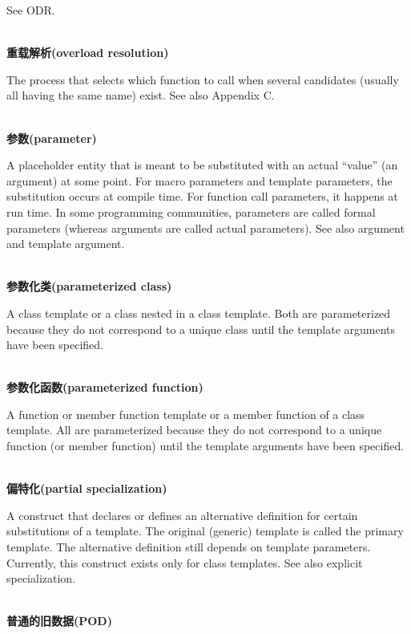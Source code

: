See ODR.

\hspace*{\fill} \\ %
\noindent
\textbf{重载解析(overload resolution)}

The process that selects which function to call when several candidates (usually all having the same name) exist. See also Appendix C.

\hspace*{\fill} \\ %
\noindent
\textbf{参数(parameter)}

A placeholder entity that is meant to be substituted with an actual “value” (an argument) at some point. For macro parameters and template parameters, the substitution occurs at compile time. For function call parameters, it happens at run time. In some programming communities, parameters are called formal parameters (whereas arguments are called actual parameters). See also argument and template argument.

\hspace*{\fill} \\ %
\noindent
\textbf{参数化类(parameterized class)}

A class template or a class nested in a class template. Both are parameterized because they do not correspond to a unique class until the template arguments have been specified.

\hspace*{\fill} \\ %
\noindent
\textbf{参数化函数(parameterized function)}

A function or member function template or a member function of a class template. All are parameterized because they do not correspond to a unique function (or member function) until the template arguments have been specified.

\hspace*{\fill} \\ %
\noindent
\textbf{偏特化(partial specialization)}

A construct that declares or defines an alternative definition for certain substitutions of a template. The original (generic) template is called the primary template. The alternative definition still depends on template parameters. Currently, this construct exists only for class templates. See also explicit specialization.

\hspace*{\fill} \\ %
\noindent
\textbf{普通的旧数据(POD)}

